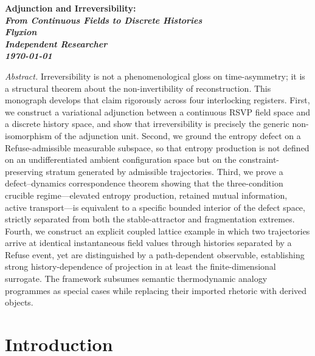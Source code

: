 \documentclass[12pt, oneside]{memoir}
\begin{document}
\begin{titlingpage}
\vspace*{2cm}
{\centering
  \LARGE\bfseries
  Adjunction and Irreversibility:\\[0.4em]
  \Large\mdseries\itshape
  From Continuous Fields to Discrete Histories\\[2.5cm]
  \normalsize\upshape\bfseries Flyxion\\[0.3em]
  \normalfont\small Independent Researcher\\[3cm]
  \normalsize\upshape\today
\par}
\vfill
{\small\noindent
\textit{Abstract.}\enspace
Irreversibility is not a phenomenological gloss on time-asymmetry; it is a structural
theorem about the non-invertibility of reconstruction.  This monograph develops that
claim rigorously across four interlocking registers.  First, we construct a variational
adjunction between a continuous RSVP field space and a discrete history space, and show
that irreversibility is precisely the generic non-isomorphism of the adjunction unit.
Second, we ground the entropy defect on a Refuse-admissible measurable subspace, so that
entropy production is not defined on an undifferentiated ambient configuration space but
on the constraint-preserving stratum generated by admissible trajectories.  Third, we
prove a defect--dynamics correspondence theorem showing that the three-condition crucible
regime---elevated entropy production, retained mutual information, active transport---is
equivalent to a specific bounded interior of the defect space, strictly separated from
both the stable-attractor and fragmentation extremes.  Fourth, we construct an explicit
coupled lattice example in which two trajectories arrive at identical instantaneous field
values through histories separated by a Refuse event, yet are distinguished by a
path-dependent observable, establishing strong history-dependence of projection in at
least the finite-dimensional surrogate.  The framework subsumes semantic thermodynamic
analogy programmes as special cases while replacing their imported rhetoric with derived
objects.
\par}
\end{titlingpage}

\clearpage
\tableofcontents*
\clearpage

\chapter{Introduction}
\label{ch:intro}
\end{document}
